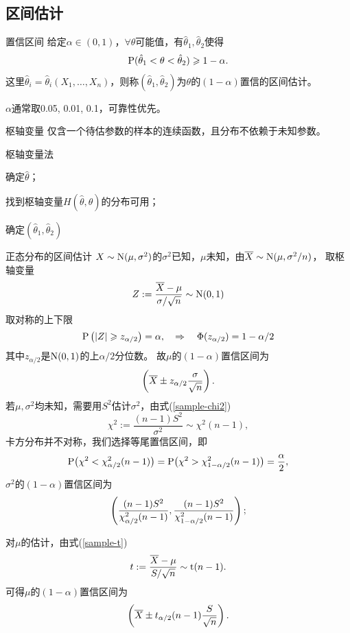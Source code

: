 \subsection{区间估计}
\begin{definition}{置信区间}{}
	给定$\alpha\in(0,1)$，$\forall\theta$可能值，有$\hat\theta_1,\hat\theta_2$使得
	\begin{align}
		\P(\hat\theta_1<\theta<\hat\theta_2)\geqslant1-\alpha.
	\end{align}
	这里$\hat\theta_i=\hat\theta_i(X_1,\ldots,X_n)$，则称$(\hat\theta_1,\hat\theta_2)$为$\theta$的$(1-\alpha)$置信的区间估计。
\end{definition}
$\alpha$通常取0.05, 0.01, 0.1，可靠性优先。
\begin{definition}{枢轴变量}{}
	仅含一个待估参数的样本的连续函数，且分布不依赖于未知参数。
\end{definition}
\begin{method}{枢轴变量法}{}
	\begin{compactenum}
		\item 确定$\hat\theta$；
		\item 找到枢轴变量$H(\hat\theta,\theta)$的分布可用；
		\item 确定$(\hat\theta_1,\hat\theta_2)$
	\end{compactenum}
\end{method}
\begin{example}{正态分布的区间估计}{}
	$X\sim\Norm(\mu,\sigma^2)$的$\sigma^2$已知，$\mu$未知，由$\avg X\sim\Norm(\mu,\sigma^2/n)$，
	取枢轴变量
	\[
		Z:=\frac{\avg X-\mu}{\sigma/\sqrt n}\sim\Norm(0,1)
	\]
	取对称的上下限
	\[
		\P\kh{\abs Z\geqslant z_{\alpha/2}}=\alpha,\thus\Phi(z_{\alpha/2})=1-\alpha/2
	\]
	其中$z_{\alpha/2}$是$\Norm(0,1)$的上$\alpha/2$分位数。
	故$\mu$的$(1-\alpha)$置信区间为
	\begin{align}
		\kh{\avg X\pm z_{\alpha/2}\frac\sigma{\sqrt n}}.
	\end{align}
	\tcblower
	若$\mu,\sigma^2$均未知，需要用$S^2$估计$\sigma^2$，由式(\ref{sample-chi2})
	\[
		\chi^2:=\frac{(n-1)S^2}{\sigma^2}\sim\chi^2(n-1),
	\]
	卡方分布并不对称，我们选择等尾置信区间，即
	\[
		\P\bigkh{\chi^2<\chi_{\alpha/2}^2(n-1)}=\P\bigkh{\chi^2>\chi_{1-\alpha/2}^2(n-1)}=\frac\alpha{2},
	\]
	$\sigma^2$的$(1-\alpha)$置信区间为
	\begin{align}
		\kh{\frac{(n-1)S^2}{\chi_{\alpha/2}^2(n-1)},\frac{(n-1)S^2}{\chi_{1-\alpha/2}^2(n-1)}};
	\end{align}

	对$\mu$的估计，由式(\ref{sample-t})
	\[
		t:=\frac{\avg X-\mu}{S/\sqrt n}\sim\mathrm t(n-1).
	\]
	可得$\mu$的$(1-\alpha)$置信区间为
	\begin{align}
		\kh{\avg X\pm t_{\alpha/2}(n-1)\frac{S}{\sqrt n}}.
	\end{align}
\end{example}
